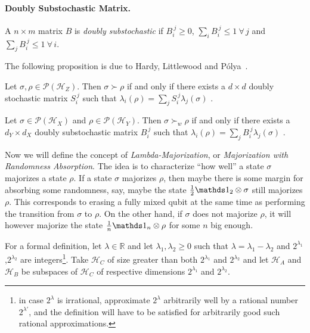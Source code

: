 \documentclass[11pt,a4paper]{article}
\def\Hs{\mathscr{H}}%
\newcommand{\POps}{\mathscr{P}}
\begin{document}
\paragraph{Doubly Substochastic Matrix.} A $n\times m$ matrix $B$ is {\em doubly substochastic} if
$B_i^{~j}\geqslant 0$, $\sum_i B_i^{~j} \leqslant 1~\forall\,j$ and $\sum_j B_i^{~j} \leqslant 1~\forall\,i$.

The following proposition is due to Hardy, Littlewood and P\'olya~\cite{HardyLittlewoodPolyaInequalities1952}.

\begin{prop}
  \label{prop:MajDblStochEquiv}
  Let $\sigma,\rho \in \POps(\Hs_Z)$. Then $\sigma\succ\rho$ if and only if there exists a $d\times d$
  doubly stochastic matrix $S_i^{~j}$ such that $\lambda_i(\rho) = \sum_j S_i^{~j}\lambda_j(\sigma)$ .
\end{prop}

\begin{prop}
  \label{prop:WeakMajDblSubstochEquiv}
  Let $\sigma \in \POps(\Hs_X)$ and $\rho\in\POps(\Hs_Y)$. Then $\sigma\succ_w\rho$ if and only if there
  exists a $d_Y \times d_X$ doubly substochastic matrix $B_i^{~j}$ such that
  $\lambda_i(\rho) = \sum_j B_i^{~j}\lambda_j(\sigma)$ .
\end{prop}


Now we will define the concept of {\em Lambda-Majorization}, or {\em Majorization with Randomness Absorption}.
The idea is to characterize ``how well'' a state $\sigma$ majorizes a state $\rho$. If a state $\sigma$ majorizes
$\rho$, then maybe there is some margin for absorbing some randomness, say, maybe the state
$\frac12\Ident_2\otimes\sigma$ still majorizes $\rho$. This corresponds to erasing a fully mixed qubit at the same time
as performing the transition from $\sigma$ to $\rho$. On the other hand, if $\sigma$
does not majorize $\rho$, it will however majorize the state $\frac1n\Ident_n\otimes\rho$ for some $n$ big enough.

For a formal definition, let $\lambda\in\mathbb{R}$ and let $\lambda_1,\lambda_2\geqslant 0$ such that
$\lambda = \lambda_1-\lambda_2$ and $2^{\lambda_1}$,$2^{\lambda_2}$ are integers\footnote{in case $2^\lambda$ is
  irrational, approximate $2^\lambda$ arbitrarily well by a rational number $2^{\lambda'}$, and the definition
  will have to be satisfied for arbitrarily good such rational approximations.}.
Take $\Hs_C$ of size greater than both $2^{\lambda_1}$ and $2^{\lambda_2}$ and let $\Hs_A$ and $\Hs_B$ be subspaces
of $\Hs_C$ of respective dimensions $2^{\lambda_1}$ and $2^{\lambda_2}$.
\end{document}

